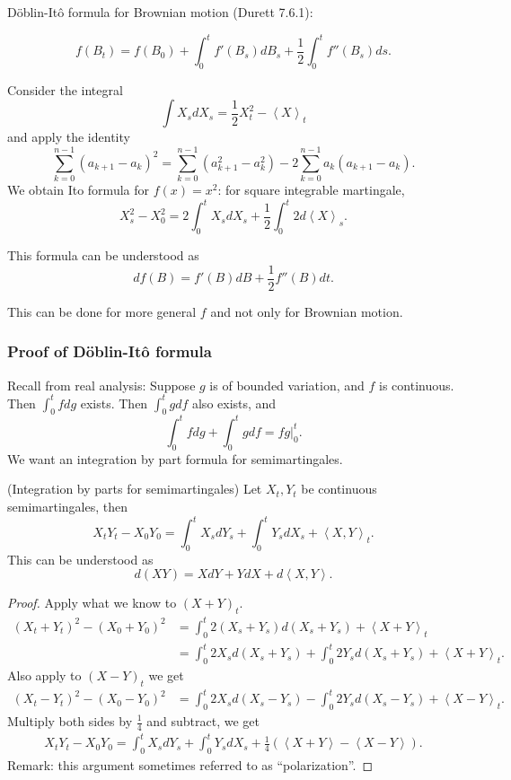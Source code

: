 
D\"oblin-Itô formula for Brownian motion (Durett 7.6.1):

\[
	f(B_t) = f(B_0) + \int _0^t f'(B_s) d B_s + \frac{1}{2} \int _0^t f''(B_s) d s
.\] 

Consider the integral
\[
	\int X_s d X_s = \frac{1}{2} X_t^2 - \left\langle X \right\rangle _t
\] 
and apply the identity
\[
	\sum_{k=0}^{n-1} (a_{k+1} - a_k)^2
	=
\sum_{k=0}^{n-1} (a_{k+1}^2 - a_{k}^2) 
- 2 \sum_{k=0}^{n-1} a_k (a_{k+1} - a_k)
.\] 
We obtain Ito formula for $f(x) = x^2$:
for square integrable martingale,
		\[
			X_s^2 - X_0^2 = 2 \int_{0}^t X_s d X_s + \frac{1}{2} \int _0^t 2 d\left\langle X \right\rangle _s
		.\] 

This formula can be understood as
\[
	d f(B) = f'(B) d B + \frac{1}{2} f'' (B) d t
.\] 

This can be done for more general $f$ and not only for Brownian motion. 

\subsubsection{Proof of D\"oblin-Itô formula}

Recall from real analysis: 
	Suppose $g$ is of bounded variation, and $f$ is continuous. Then $\int _0^t f d g $ exists. Then $\int _0^t g df $ also exists, and 
	\[
		\int _0^t f dg + \int _0^t g df = fg |_0^t
	.\] 
We want an integration by part formula for semimartingales.

\begin{proposition}
	(Integration by parts for semimartingales)
	Let $X_t, Y_t$ be continuous semimartingales, then
	\[
		X_t Y_t - X_0 Y_0 = \int _0^t X_s d Y_s + \int _0^t Y_s d X_s + \left\langle X, Y \right\rangle _t
	.\] 
	This can be understood as
	\[
		d(XY) = X dY + Y d X + d\left\langle X, Y \right\rangle 
	.\] 
\end{proposition}
\begin{proof}
	Apply what we know to $(X + Y)_t$.
	\begin{align*}
		(X_t + Y_t)^2 - (X_0 + Y_0)^2
		&= \int _0^t 2\left( X_s + Y_s \right) d (X_s + Y_s) + \left\langle X + Y \right\rangle _t\\
		&= \int _0^t 2X_s d (X_s + Y_s) + \int _0^t 2Y_s d (X_s + Y_s) +\left\langle X+ Y \right\rangle _t
	.\end{align*} 
	Also apply to  $(X - Y)_t$ we get
\begin{align*}
		(X_t - Y_t)^2 - (X_0 - Y_0)^2
		&= \int _0^t 2X_s d (X_s - Y_s) - \int _0^t 2Y_s d (X_s - Y_s) +\left\langle X - Y \right\rangle _t
	.\end{align*}
	Multiply both sides by $\frac{1}{4}$ and subtract, we get
	\begin{align*}
		X_t Y_t - X_0 Y_0 = \int _0^t X_s d Y_s+  \int _0^t Y_s d X_s + \frac{1}{4} \left( \left\langle X + Y \right\rangle  - \left\langle X - Y \right\rangle  \right) 
	.\end{align*}
	Remark: this argument sometimes referred to as ``polarization''. 
\end{proof}

